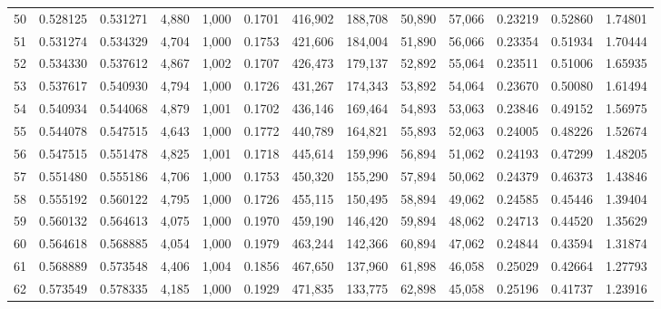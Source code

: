 \begin{tabular}{rrrrrrrrrrrrr}
50  &  0.528125 &  0.531271 &   4,880 &  1,000 &                                     0.1701 &  416,902 &  188,708 &   50,890 &   57,066 &  0.23219 &  0.52860 &  1.74801 \\
51  &  0.531274 &  0.534329 &   4,704 &  1,000 &                                     0.1753 &  421,606 &  184,004 &   51,890 &   56,066 &  0.23354 &  0.51934 &  1.70444 \\
52  &  0.534330 &  0.537612 &   4,867 &  1,002 &                                     0.1707 &  426,473 &  179,137 &   52,892 &   55,064 &  0.23511 &  0.51006 &  1.65935 \\
53  &  0.537617 &  0.540930 &   4,794 &  1,000 &                                     0.1726 &  431,267 &  174,343 &   53,892 &   54,064 &  0.23670 &  0.50080 &  1.61494 \\
54  &  0.540934 &  0.544068 &   4,879 &  1,001 &                                     0.1702 &  436,146 &  169,464 &   54,893 &   53,063 &  0.23846 &  0.49152 &  1.56975 \\
55  &  0.544078 &  0.547515 &   4,643 &  1,000 &                                     0.1772 &  440,789 &  164,821 &   55,893 &   52,063 &  0.24005 &  0.48226 &  1.52674 \\
56  &  0.547515 &  0.551478 &   4,825 &  1,001 &                                     0.1718 &  445,614 &  159,996 &   56,894 &   51,062 &  0.24193 &  0.47299 &  1.48205 \\
57  &  0.551480 &  0.555186 &   4,706 &  1,000 &                                     0.1753 &  450,320 &  155,290 &   57,894 &   50,062 &  0.24379 &  0.46373 &  1.43846 \\
58  &  0.555192 &  0.560122 &   4,795 &  1,000 &                                     0.1726 &  455,115 &  150,495 &   58,894 &   49,062 &  0.24585 &  0.45446 &  1.39404 \\
59  &  0.560132 &  0.564613 &   4,075 &  1,000 &                                     0.1970 &  459,190 &  146,420 &   59,894 &   48,062 &  0.24713 &  0.44520 &  1.35629 \\
60  &  0.564618 &  0.568885 &   4,054 &  1,000 &                                     0.1979 &  463,244 &  142,366 &   60,894 &   47,062 &  0.24844 &  0.43594 &  1.31874 \\
61  &  0.568889 &  0.573548 &   4,406 &  1,004 &                                     0.1856 &  467,650 &  137,960 &   61,898 &   46,058 &  0.25029 &  0.42664 &  1.27793 \\
62  &  0.573549 &  0.578335 &   4,185 &  1,000 &                                     0.1929 &  471,835 &  133,775 &   62,898 &   45,058 &  0.25196 &  0.41737 &  1.23916 \\

\end{tabular}
